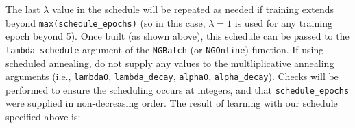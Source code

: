 \documentclass[11pt,]{article}
\newenvironment{Shaded}{}{}
\newcommand{\CommentTok}[1]{\textcolor[rgb]{0.00,0.50,0.00}{#1}}
\newcommand{\DataTypeTok}[1]{#1}
\newcommand{\DecValTok}[1]{#1}
\newcommand{\KeywordTok}[1]{\textcolor[rgb]{0.00,0.00,1.00}{#1}}
\newcommand{\NormalTok}[1]{#1}
\newcommand{\OperatorTok}[1]{#1}
\newcommand{\StringTok}[1]{\textcolor[rgb]{0.00,0.50,0.50}{#1}}
\begin{document}
The last \(\lambda\) value in the schedule will be repeated as needed if
training extends beyond \texttt{max(schedule\_epochs)} (so in this case,
\(\lambda = 1\) is used for any training epoch beyond 5). Once built (as
shown above), this schedule can be passed to the
\texttt{lambda\_schedule} argument of the \texttt{NGBatch} (or
\texttt{NGOnline}) function. If using scheduled annealing, do not supply
any values to the multliplicative annealing arguments (i.e.,
\texttt{lambda0}, \texttt{lambda\_decay}, \texttt{alpha0},
\texttt{alpha\_decay}). Checks will be performed to ensure the
scheduling occurs at integers, and that \texttt{schedule\_epochs} were
supplied in non-decreasing order. The result of learning with our
schedule specified above is:

\begin{Shaded}
\end{Shaded}
\end{document}
